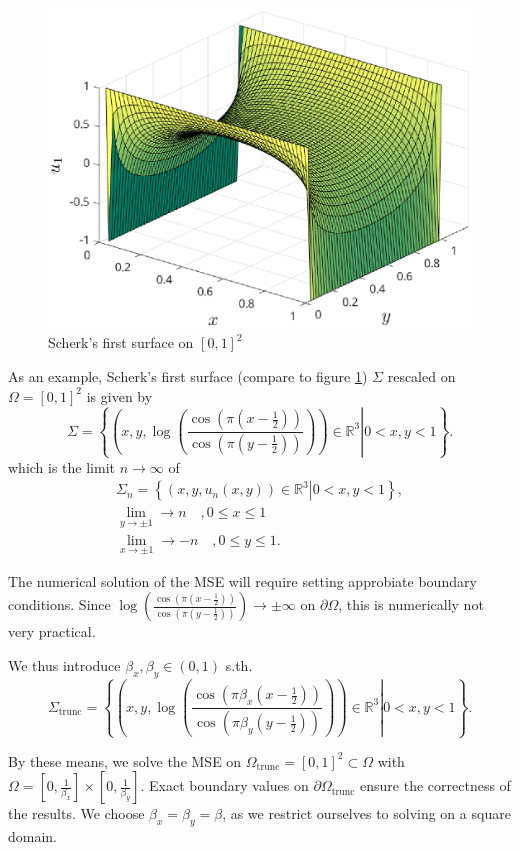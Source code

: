 \documentclass[11pt]{scrartcl}
\begin{document}
\begin{figure}
	\centering
	\includegraphics[width=.5\textwidth]{figs/scherk-test}
	\caption{Scherk's first surface on $[0,1]^2$}\label{fig:scherk01}
\end{figure}


\newpage

As an example, Scherk's first surface (compare to figure \ref{fig:scherk01}) $\Sigma$ rescaled on $\Omega = [0,1]^2$ is given by
\begin{equation}
	\Sigma = \left\{ \left. \left(x, y, \log \left( \frac{\cos (\pi(x-\frac{1}{2}))}{\cos (\pi(y-\frac{1}{2}))} \right) \right) \in \mathbb{R}^{3} \right  | 0 < x, y < 1 \right\}.
\end{equation} 
which is the limit $n\to \infty$ of 
\begin{align}
\Sigma_n = \left\{ \left. \left(x, y, u_n(x,y) \right) \in \mathbb{R}^{3} \right  | 0 < x, y < 1 \right\}, \\
\lim\limits_{y\to \pm 1} \to n \quad, 0 \le x \le 1 \\
\lim\limits_{x\to \pm 1} \to -n \quad, 0 \le y \le 1.
\end{align}


The numerical solution of the MSE will require setting approbiate boundary conditions. Since $\log \left( \frac{\cos (\pi(x-\frac{1}{2}))}{\cos (\pi(y-\frac{1}{2}))} \right) \to \pm \infty $ on $\partial\Omega$, this is numerically not very practical. 

We thus introduce $\beta_x,\beta_y \in (0,1)$ s.th. 
\begin{equation}
\Sigma_{\text{trunc}} = \left\{ \left. \left(x, y, \log \left( \frac{\cos (\pi\beta_x(x-\frac{1}{2}))}{\cos (\pi\beta_y(y-\frac{1}{2}))} \right) \right) \in \mathbb{R}^{3} \right  | 0 < x, y < 1 \right\}.
\end{equation} 

By these means, we solve the MSE on $\Omega_\text{trunc}=[0,1]^2\subset\Omega$ with $\Omega=[0,\frac{1}{\beta_x}]\times[0,\frac{1}{\beta_y}]$. Exact boundary values on $\partial\Omega_\text{trunc}$ ensure the correctness of the results. We choose $\beta_x=\beta_y=\beta$, as we restrict ourselves to solving on a square domain.
\end{document}
